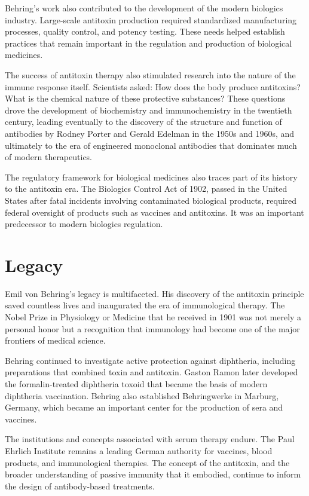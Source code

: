 Behring's work also contributed to the development of the modern biologics industry. Large-scale antitoxin production required standardized manufacturing processes, quality control, and potency testing. These needs helped establish practices that remain important in the regulation and production of biological medicines.

The success of antitoxin therapy also stimulated research into the nature of the immune response itself. Scientists asked: How does the body produce antitoxins? What is the chemical nature of these protective substances? These questions drove the development of biochemistry and immunochemistry in the twentieth century, leading eventually to the discovery of the structure and function of antibodies by Rodney Porter and Gerald Edelman in the 1950s and 1960s, and ultimately to the era of engineered monoclonal antibodies that dominates much of modern therapeutics.

The regulatory framework for biological medicines also traces part of its history to the antitoxin era. The Biologics Control Act of 1902, passed in the United States after fatal incidents involving contaminated biological products, required federal oversight of products such as vaccines and antitoxins. It was an important predecessor to modern biologics regulation.\cite{fda-biologics}

\section{Legacy}

Emil von Behring's legacy is multifaceted. His discovery of the antitoxin principle saved countless lives and inaugurated the era of immunological therapy. The Nobel Prize in Physiology or Medicine that he received in 1901 was not merely a personal honor but a recognition that immunology had become one of the major frontiers of medical science.

Behring continued to investigate active protection against diphtheria, including preparations that combined toxin and antitoxin. Gaston Ramon later developed the formalin-treated diphtheria toxoid that became the basis of modern diphtheria vaccination. Behring also established Behringwerke in Marburg, Germany, which became an important center for the production of sera and vaccines.\cite{nobel-history}

The institutions and concepts associated with serum therapy endure. The Paul Ehrlich Institute remains a leading German authority for vaccines, blood products, and immunological therapies. The concept of the antitoxin, and the broader understanding of passive immunity that it embodied, continue to inform the design of antibody-based treatments.\cite{pei-history}

